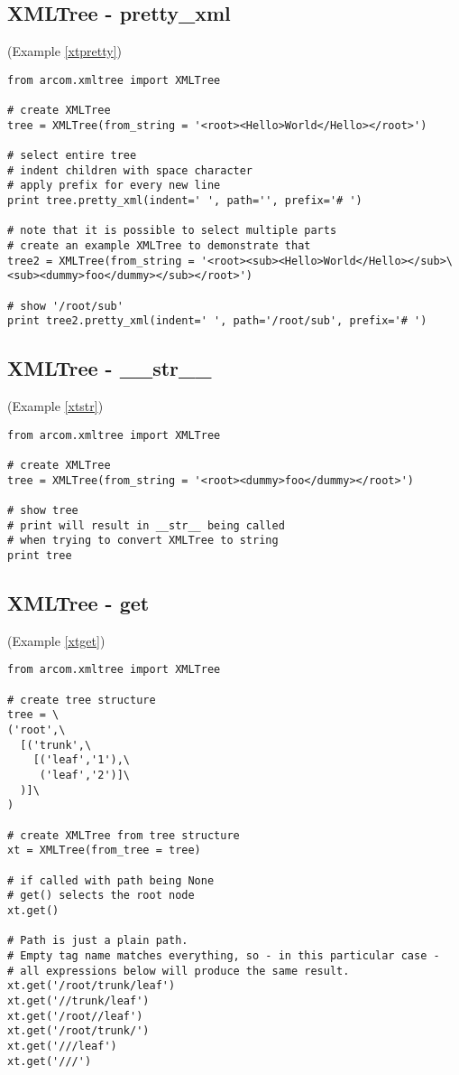 \subsection{XMLTree - pretty\_xml}
(Example \ref{xtpretty})
\label{cxtpretty}
\begin{verbatim}
from arcom.xmltree import XMLTree

# create XMLTree
tree = XMLTree(from_string = '<root><Hello>World</Hello></root>')

# select entire tree
# indent children with space character
# apply prefix for every new line
print tree.pretty_xml(indent=' ', path='', prefix='# ')

# note that it is possible to select multiple parts
# create an example XMLTree to demonstrate that
tree2 = XMLTree(from_string = '<root><sub><Hello>World</Hello></sub>\
<sub><dummy>foo</dummy></sub></root>')

# show '/root/sub'
print tree2.pretty_xml(indent=' ', path='/root/sub', prefix='# ')
\end{verbatim}

\subsection{XMLTree - \_\_str\_\_}
(Example \ref{xtstr})
\label{cxtstr}
\begin{verbatim}
from arcom.xmltree import XMLTree

# create XMLTree
tree = XMLTree(from_string = '<root><dummy>foo</dummy></root>')

# show tree
# print will result in __str__ being called
# when trying to convert XMLTree to string
print tree
\end{verbatim}

\subsection{XMLTree - get}
(Example \ref{xtget})
\label{cxtget}
\begin{verbatim}
from arcom.xmltree import XMLTree

# create tree structure
tree = \
('root',\
  [('trunk',\
    [('leaf','1'),\
     ('leaf','2')]\
  )]\
)

# create XMLTree from tree structure
xt = XMLTree(from_tree = tree)

# if called with path being None
# get() selects the root node
xt.get()

# Path is just a plain path.
# Empty tag name matches everything, so - in this particular case -
# all expressions below will produce the same result.
xt.get('/root/trunk/leaf')
xt.get('//trunk/leaf')
xt.get('/root//leaf')
xt.get('/root/trunk/')
xt.get('///leaf')
xt.get('///')
\end{verbatim}


